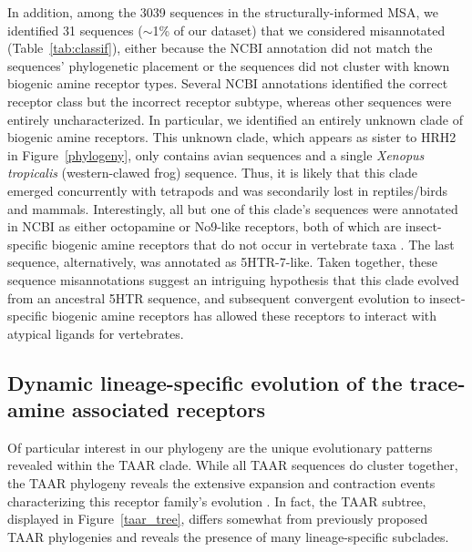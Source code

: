 \documentclass[fleqn,10pt]{wlpeerj}
\begin{document}
In addition, among the 3039 sequences in the structurally-informed MSA, we identified 31 sequences ($\sim$1\% of our dataset) that we considered misannotated (Table~\ref{tab:classif}), either because the NCBI annotation did not match the sequences' phylogenetic placement or the sequences did not cluster with known biogenic amine receptor types. Several NCBI annotations identified the correct receptor class but the incorrect receptor subtype, whereas other sequences were entirely uncharacterized. In particular, we identified an entirely unknown clade of biogenic amine receptors. This unknown clade, which appears as sister to HRH2 in Figure~\ref{phylogeny}, only contains avian sequences and a single \emph{Xenopus tropicalis} (western-clawed frog) sequence. Thus, it is likely that this clade emerged concurrently with tetrapods and was secondarily lost in reptiles/birds and mammals. Interestingly, all but one of this clade's sequences were annotated in NCBI as either octopamine or No9-like receptors, both of which are insect-specific biogenic amine receptors that do not occur in vertebrate taxa \citep{Roeder2005}. The last sequence, alternatively, was annotated as 5HTR-7-like. Taken together, these sequence misannotations suggest an intriguing hypothesis that this clade evolved from an ancestral 5HTR sequence, and subsequent convergent evolution to insect-specific biogenic amine receptors has allowed these receptors to interact with atypical ligands for vertebrates.


\subsection*{Dynamic lineage-specific evolution of the trace-amine associated receptors}
Of particular interest in our phylogeny are the unique evolutionary patterns revealed within the TAAR clade. While all TAAR sequences do cluster together, the TAAR phylogeny reveals the extensive expansion and contraction events characterizing this receptor family's evolution \citep{Lindemann2005,Hashiguchi2007,Staubert2010,Staubert2013}. In fact, the TAAR subtree, displayed in Figure~\ref{taar_tree}, differs somewhat from previously proposed TAAR phylogenies \citep{Lindemann2005, Hashiguchi2007} and reveals the presence of many lineage-specific subclades.
\end{document}
